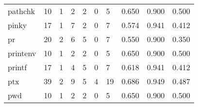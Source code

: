 \begin{longtable}{lp{1.3cm}p{1.3cm}p{1.3cm}p{1.3cm}p{1.3cm}p{1.3cm}p{1.3cm}p{1.3cm}p{1.3cm}}
pathchk   &                     10 &                                             1 &                                            2 &                                           2 &                                            0 &                                          5 &                                0.650 &                                  0.900 &                                0.500 \\
pinky     &                     17 &                                             1 &                                            7 &                                           2 &                                            0 &                                          7 &                                0.574 &                                  0.941 &                                0.412 \\
pr        &                     20 &                                             2 &                                            6 &                                           5 &                                            0 &                                          7 &                                0.550 &                                  0.900 &                                0.350 \\
printenv  &                     10 &                                             1 &                                            2 &                                           2 &                                            0 &                                          5 &                                0.650 &                                  0.900 &                                0.500 \\
printf    &                     17 &                                             1 &                                            4 &                                           5 &                                            0 &                                          7 &                                0.618 &                                  0.941 &                                0.412 \\
ptx       &                     39 &                                             2 &                                            9 &                                           5 &                                            4 &                                         19 &                                0.686 &                                  0.949 &                                0.487 \\
pwd       &                     10 &                                             1 &                                            2 &                                           2 &                                            0 &                                          5 &                                0.650 &                                  0.900 &                                0.500 \\

\end{longtable}
